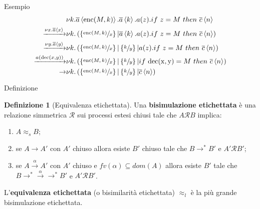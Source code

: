 \documentclass{beamer}
\newcounter{counter1}
\theoremstyle{plain}
\theoremstyle{definition}
\newtheorem{mydef}[counter1]{Definizione}
\theoremstyle{remark}
\newcommand{\obar}[1]{\overline{#1}}
\newcommand{\set}[1]{\left\{#1\right\}}
\newcommand{\pa}[1]{\left(#1\right)}
\newcommand{\ang}[1]{\left<#1\right>}
\begin{document}
\begin{frame}{Esempio}
  \begin{align*}
    & \nu k. \obar{a} \ang{\mathrm{enc}(M,k)}.\obar{a}\ang{k}.a(z).if\
      z=M\ then\ \obar{c}\ang{n} \\
    \xrightarrow{\nu x.\obar{a}\ang{x}} & \nu
                                          k.\pa{\set{\sfrac{\mathrm{enc}(M,k)}{x}}|
                                          \obar{a}\ang{k}. a(z).if\
                                          z=M\ then\ \obar{c}\ang{n}}
    \\
    \xrightarrow{\nu y.\obar{a}\ang{y}} & \nu k. \pa{
                                          \set{\sfrac{\mathrm{enc}(M,k)}{x}}
                                          | \set{\sfrac{k}{y}} |
                                          a(z).if\ z=M\ then\
                                          \obar{c}\ang{n}} \\
    \xrightarrow{a\pa{\mathrm{dec}(x,y)}} & \nu k. \pa{
                                            \set{\sfrac{\mathrm{enc}(M,k)}{x}}
                                            | \set{\sfrac{k}{y}} | if\
                                            \mathrm{dec(x,y)}=M\ then\
                                            \obar{c}\ang{n}} \\
    \rightarrow & \nu k. \pa{ \set{\sfrac{\mathrm{enc}(M,k)}{x}} |
                  \set{\sfrac{k}{y}} | \obar{c}\ang{n}} 
  \end{align*}
\end{frame}

\begin{frame}{Definizione}
  \begin{mydef}[Equivalenza etichettata]
    Una \textbf{bisimulazione etichettata} \`e una relazione
    simmetrica $\mathcal{R}$ sui processi estesi chiusi tale che $A
    \mathcal{R} B$ implica:
    \begin{enumerate}
    \item $A \approx _s B$;
    \item se $A \rightarrow A'$ con $A'$ chiuso allora esiste $B'$
      chiuso tale che $B \rightarrow ^* B'$ e $A' \mathcal{R} B'$;
    \item se $A \xrightarrow{\alpha} A'$ con $A'$ chiuso e
      $fv(\alpha) \subseteq dom(A)$ allora esiste $B'$ tale che
      $B \rightarrow ^* \xrightarrow{\alpha} \rightarrow ^* B'$ e
      $A' \mathcal{R} B'$.
    \end{enumerate}
    L'\textbf{equivalenza etichettata} (o bisimilarit\`a etichettata)
    $\approx _l$ \`e la pi\`u grande bisimulazione etichettata.
  \end{mydef}
\end{frame}
\end{document}
